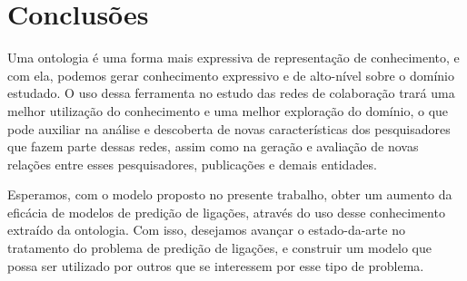 \chapter{Conclusões}
\label{cap:conclusoes}

Uma ontologia é uma forma mais expressiva de representação de conhecimento, e com ela, podemos gerar conhecimento expressivo e de alto-nível sobre o domínio estudado. O uso dessa ferramenta no estudo das redes de colaboração trará uma melhor utilização do conhecimento e uma melhor exploração do domínio, o que pode auxiliar na análise e descoberta de novas características dos pesquisadores que fazem parte dessas redes, assim como na geração e avaliação de novas relações entre esses pesquisadores, publicações e demais entidades.

Esperamos, com o modelo proposto no presente trabalho, obter um aumento da eficácia de modelos de predição de ligações, através do uso desse conhecimento extraído da ontologia. Com isso, desejamos avançar o estado-da-arte no tratamento do problema de predição de ligações, e construir um modelo que possa ser utilizado por outros que se interessem por esse tipo de problema.
